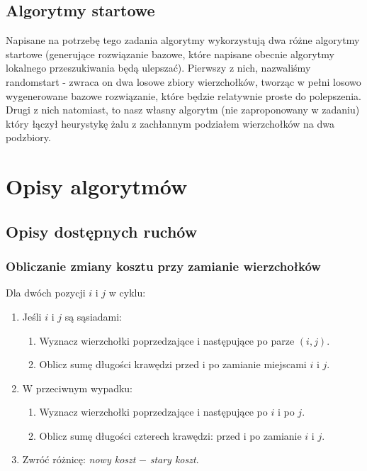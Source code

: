 \documentclass[11pt]{article}
\begin{document}
\subsection{Algorytmy startowe}\label{subsec:algorytmy-startowe}

Napisane na potrzebę tego zadania algorytmy wykorzystują dwa różne algorytmy startowe
(generujące rozwiązanie bazowe, które napisane obecnie algorytmy lokalnego przeszukiwania będą ulepszać).
Pierwszy z nich, nazwaliśmy randomstart - zwraca on dwa losowe zbiory wierzchołków, tworząc w pełni losowo wygenerowane bazowe rozwiązanie, które będzie relatywnie proste do polepszenia.
Drugi z nich natomiast, to nasz własny algorytm (nie zaproponowany w zadaniu) który łączył heurystykę żalu z zachłannym podziałem wierzchołków na dwa podzbiory.


\section{Opisy algorytmów}\label{sec:opisy-alg}

\subsection{Opisy dostępnych ruchów}

\subsubsection{Obliczanie zmiany kosztu przy zamianie wierzchołków}

Dla dwóch pozycji $i$ i $j$ w cyklu:
\begin{enumerate}
    \item Jeśli $i$ i $j$ są sąsiadami:
    \begin{enumerate}
        \item Wyznacz wierzchołki poprzedzające i następujące po parze $(i, j)$.
        \item Oblicz sumę długości krawędzi przed i po zamianie miejscami $i$ i $j$.
    \end{enumerate}
    \item W przeciwnym wypadku:
    \begin{enumerate}
        \item Wyznacz wierzchołki poprzedzające i następujące po $i$ i po $j$.
        \item Oblicz sumę długości czterech krawędzi: przed i po zamianie $i$ i $j$.
    \end{enumerate}
    \item Zwróć różnicę: \textit{nowy koszt} $-$ \textit{stary koszt}.
\end{enumerate}
\end{document}

